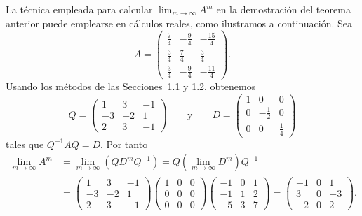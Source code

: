 \documentclass[12pt,a4paper]{book}
\begin{document}
    La técnica empleada para calcular $\lim_{m\to\infty}A^m$ en la demostración del teorema anterior puede emplearse en cálculos reales, como ilustramos a continuación. Sea
    \begin{equation*}
        A=\begin{pmatrix}\frac74&-\frac94&-\frac{15}4\\[0.3ex]\frac34&\frac74&\frac34\\[0.3ex]\frac34&-\frac94&-\frac{11}4\end{pmatrix}.
    \end{equation*}
    Usando los métodos de las Secciones~1.1 y 1.2, obtenemos
    \begin{equation*}
        Q=\begin{pmatrix}1&3&-1\\-3&-2&1\\2&3&-1\end{pmatrix} \qquad\text{y}\qquad D=\begin{pmatrix}1&0&0\\0&-\frac12&0\\0&0&\frac14\end{pmatrix}
    \end{equation*}
    tales que $Q^{-1}AQ=D$. Por tanto
    \begin{align*}
        \lim_{m\to\infty}A^m&=\lim_{m\to\infty}(QD^mQ^{-1})=Q\left(\lim_{m\to\infty}D^m\right)Q^{-1}\\
        &=\begin{pmatrix}1&3&-1\\-3&-2&1\\2&3&-1\end{pmatrix}\begin{pmatrix}1&0&0\\0&0&0\\0&0&0\end{pmatrix}\begin{pmatrix}-1&0&1\\-1&1&2\\-5&3&7\end{pmatrix}
        =\begin{pmatrix}-1&0&1\\3&0&-3\\-2&0&2\end{pmatrix}.
    \end{align*}
\end{document}
